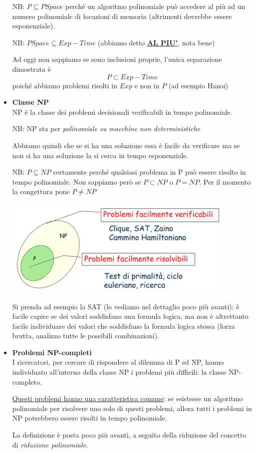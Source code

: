 \begin{itemize}
	NB: $P \subseteq PSpace$ perché un algoritmo polinomiale può accedere al più ad un numero polinomiale di locazioni di memoria (altrimenti dovrebbe essere esponenziale).
	
	NB: $PSpace \subseteq Exp-Time$ (abbiamo detto \textbf{\underline{AL PIU'}}, nota bene)
	
	Ad oggi non sappiamo se sono inclusioni proprie, l'unica separazione dimostrata è \[P \subset Exp-Time\] poiché abbiamo problemi risolti in $Exp$ e non in $P$ (ad esempio Hanoi)

	\item \textbf{Classe NP}\\
	NP è la classe dei problemi decisionali verificabili in tempo polinomiale.
	
	NB: NP sta per \emph{polinomiale su macchine non deterministiche}
	
	Abbiamo quindi che se si ha una soluzione essa è facile da verificare ma se non si ha una soluzione la si cerca in tempo esponenziale.
	
	NB: $P \subseteq NP$ certamente perché qualsiasi problema in P può essere risolto in tempo polinomiale. Non sappiamo però se $P \subset NP$ o $P = NP$. Per il momento la congettura pone $P \neq NP$
	\begin{center}
		\includegraphics{images/2.PNG}
	\end{center}
	Si prenda ad esempio la SAT (lo vediamo nel dettaglio poco più avanti): è facile capire se dei valori soddisfano una formula logica, ma non è altrettanto facile individuare dei valori che soddisfano la formula logica stessa (forza brutta, analizzo tutte le possibili combinazioni).
	
	\item \textbf{Problemi NP-completi}\\
	I ricercatori, per cercare di rispondere al dilemma di P ed NP, hanno individuato all’interno della classe NP i problemi più difficili: la classe NP-completo.
	
	\underline{Questi problemi hanno una caratteristica comune}: se esistesse un algoritmo polinomiale per risolvere uno solo di questi problemi, allora tutti i problemi in NP potrebbero essere risolti in tempo polinomiale.
	
	La definizione è posta poco più avanti, a seguito della riduzione del concetto di \emph{riduzione polinomiale}.
\end{itemize}


